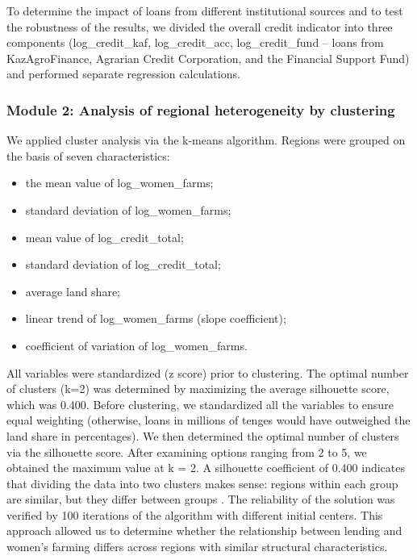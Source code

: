 ﻿\documentclass[pdflatex,sn-mathphys-ay]{sn-jnl}
\begin{document}
To determine the impact of loans from different institutional sources
and to test the robustness of the results, we divided the overall credit
indicator into three components (log\_credit\_kaf, log\_credit\_acc,
log\_credit\_fund -- loans from KazAgroFinance, Agrarian Credit
Corporation, and the Financial Support Fund) and performed separate
regression calculations.

\subsubsection{Module 2: Analysis of regional heterogeneity by clustering}

We applied cluster analysis via the k-means algorithm. Regions were
grouped on the basis of seven characteristics:

\begin{itemize}
\item the mean value of log\_women\_farms;
\item standard deviation of log\_women\_farms;
\item mean value of log\_credit\_total;
\item standard deviation of log\_credit\_total;
\item average land share;
\item linear trend of log\_women\_farms (slope coefficient);
\item coefficient of variation of log\_women\_farms.
\end{itemize}

All variables were standardized (z score) prior to clustering. The
optimal number of clusters (k=2) was determined by maximizing the
average silhouette score, which was 0.400. Before clustering, we
standardized all the variables to ensure equal weighting (otherwise,
loans in millions of tenges would have outweighed the land share in
percentages). We then determined the optimal number of clusters via the silhouette
score. After examining options ranging from 2 to 5, we obtained the
maximum value at k = 2. A silhouette coefficient of 0.400 indicates that
dividing the data into two clusters makes sense: regions within each
group are similar, but they differ between groups \citep{ref45}. The reliability of the solution was verified by 100 iterations
of the algorithm with different initial centers. This approach allowed
us to determine whether the relationship between lending and women's
farming differs across regions with similar structural characteristics.
\end{document}
